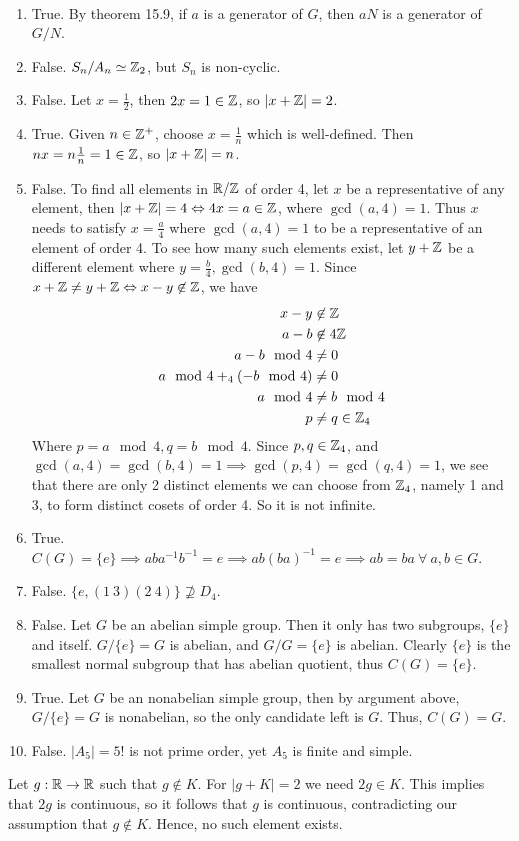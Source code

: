 \documentclass[12pt]{article}
\begin{document}
\begin{problem}[15.19]
~\begin{enumerate}[label=\alph*)]
	\item True. By theorem 15.9, if $ a$ is a generator of  $ G$, then  $ aN$ is a generator of  $ G /N$.
	\item False.  $ S_n /A_n \simeq \mathbb{Z}_2$, but $ S_n$ is non-cyclic.
	\item False. Let $ x = \frac{1}{2}$, then $ 2x =1\in \mathbb{Z}$, so $ |x+\mathbb{Z}|=2$.
	\item True. Given $ n \in \mathbb{Z}^+$, choose $ x=\frac{1}{n}$ which is well-defined. Then $ nx = n\frac{1}{n}=1 \in \mathbb{Z}$, so $ |x+\mathbb{Z}|=n$.
	\item False. To find all elements in $ \mathbb{R} /\mathbb{Z}$ of order 4, let $ x$ be a representative of any element, then $| x+\mathbb{Z} | =4 \Leftrightarrow 4x = a \in \mathbb{Z}$, where $ \gcd(a,4)=1$. Thus $ x$ needs to satisfy  $ x=\frac{a}{4}$ where $ \gcd(a,4)=1$ to be a representative of an element of order 4. To see how many such elements exist, let $ y+\mathbb{Z}$ be a different element where $ y=\frac{b}{4}, \gcd(b,4)=1$. Since  $ x+\mathbb{Z} \neq y+\mathbb{Z} \Leftrightarrow x-y \not\in \mathbb{Z}$, we have
		\begin{align*}
			x-y &\not\in \mathbb{Z}\\
			a-b &\not\in 4\mathbb{Z}\\
			a-b \mod 4 &\neq 0\\
			a \mod 4 +_{ 4} (-b \mod 4) &\neq 0\\
			a \mod 4 &\neq b \mod 4\\
			p &\neq q \in \mathbb{Z}_4
		\end{align*}
		Where $ p=a \mod 4, q=b \mod 4$. Since $ p,q \in \mathbb{Z}_4$, and $ \gcd(a,4)=\gcd(b,4)=1 \implies \gcd(p,4)=\gcd(q,4)=1$,  we see that there are only 2 distinct elements we can choose from $ \mathbb{Z}_4$, namely 1 and 3, to form distinct cosets of order 4. So it is not infinite.
	\item True. $C(G) = \{e\} \implies aba^{-1}b ^{-1} = e \implies ab(ba)^{-1}=e \implies ab=ba \ \forall \ a,b \in G$.
	\item False. $ \{e, (1\ 3)(2\ 4)\} \not \supseteq D_4 $.
	\item False. Let $ G$ be an abelian simple group. Then it only has two subgroups,  $ \{e\} $ and itself. $ G / \{e\}= G $ is abelian, and $ G / G =\{e\} $ is abelian.  Clearly $ \{e\} $ is the smallest normal subgroup that has abelian quotient, thus $ C(G) = \{e\} $.
	\item True. Let $ G$ be an nonabelian simple group, then by argument above,  $ G / \{e\} = G $ is nonabelian, so the only candidate left is $ G$. Thus,  $ C(G)=G$.
	\item False.  $ |A_5| = 5!$ is not prime order, yet $ A_5$ is finite and simple. 
\end{enumerate}
\end{problem}
\begin{problem}[15.22]
Let $ g: \mathbb{R} \to \mathbb{R}$ such that $ g \not\in K$. For $ |g+K|=2 $ we need  $ 2g \in K$. This implies that $ 2g $ is continuous, so it follows that  $ g$ is continuous, contradicting our assumption that  $ g \not\in K$. Hence, no such element exists.
\end{problem}
\end{document}
